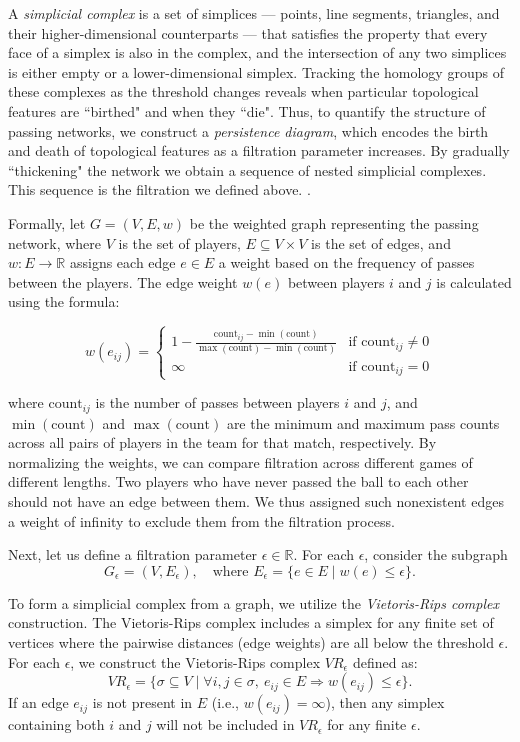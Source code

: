 \documentclass[10pt,twocolumn]{article}
\begin{document}
A \textit{simplicial complex} is a set of simplices — points, line segments, triangles, and their higher-dimensional counterparts — that satisfies the property that every face of a simplex is also in the complex, and the intersection of any two simplices is either empty or a lower-dimensional simplex. Tracking the homology groups of these complexes as the threshold changes reveals when particular topological features are ``birthed" and when they ``die". Thus, to quantify the structure of passing networks, we construct a \textit{persistence diagram}, which encodes the birth and death of topological features as a filtration parameter increases. By gradually ``thickening" the network we obtain a sequence of nested simplicial complexes. This sequence is the filtration we defined above.  \cite{aktas-2019}.


Formally, let $ G = (V, E, w) $ be the weighted graph representing the passing network, where $ V $ is the set of players, $ E \subseteq V \times V $ is the set of edges, and $ w: E \to \mathbb{R} $ assigns each edge \(e \in E\) a weight based on the frequency of passes between the players. The edge weight $ w(e) $ between players $ i $ and $ j $ is calculated using the formula:

\[
w(e_{ij}) = 
\begin{cases} 
1 - \frac{\text{count}_{ij} - \min(\text{count})}{\max(\text{count}) - \min(\text{count})} & \text{if } \text{count}_{ij} \neq 0 \\
\infty & \text{if } \text{count}_{ij} = 0
\end{cases}
\]

where $ \text{count}_{ij} $ is the number of passes between players $ i $ and $ j $, and $ \min(\text{count}) $ and $ \max(\text{count}) $ are the minimum and maximum pass counts across all pairs of players in the team for that match, respectively. By normalizing the weights, we can compare filtration across different games of different lengths. Two players who have never passed the ball to each other should not have an edge between them. We thus assigned such nonexistent edges a weight of infinity to exclude them from the filtration process.

Next, let us define a filtration parameter $\epsilon \in \mathbb{R}$. For each $\epsilon$, consider the subgraph  
\[
G_\epsilon = (V, E_\epsilon), \quad \text{where } E_\epsilon = \{ e \in E \mid w(e) \leq \epsilon \}.
\]

To form a simplicial complex from a graph, we utilize the \textit{Vietoris-Rips complex} construction. The Vietoris-Rips complex includes a simplex for any finite set of vertices where the pairwise distances (edge weights) are all below the threshold $\epsilon$. For each $\epsilon$, we construct the Vietoris-Rips complex $ VR_\epsilon $ defined as:
\[
VR_\epsilon = \{ \sigma \subseteq V \mid \forall i, j \in \sigma, \ e_{ij} \in E \Rightarrow w(e_{ij}) \leq \epsilon \}.
\]
If an edge $ e_{ij} $ is not present in $ E $ (i.e., $ w(e_{ij}) = \infty $), then any simplex containing both $ i $ and $ j $ will not be included in $ VR_\epsilon $ for any finite $\epsilon$.
\end{document}
